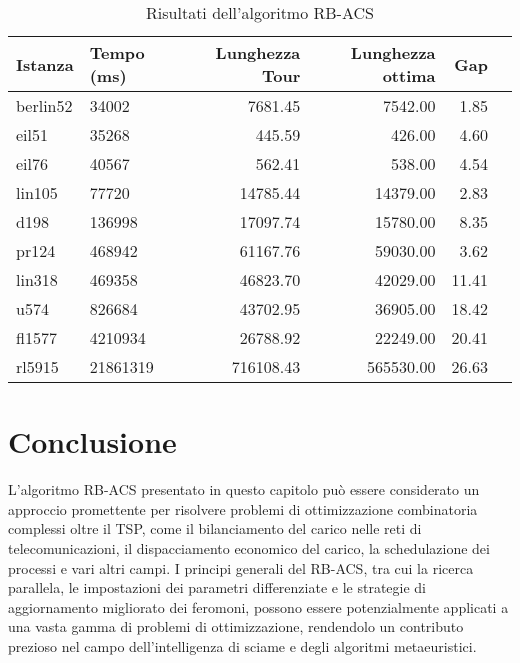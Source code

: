 \begin{table}
	\centering
	\caption{Risultati dell'algoritmo RB-ACS}
	\begin{tabular}{llrrrr}
		\toprule
		Istanza  & Tempo (ms) & Lunghezza Tour & Lunghezza ottima & Gap   \\
		\midrule
		berlin52 & 34002      & 7681.45        & 7542.00          & 1.85  \\
		eil51    & 35268      & 445.59         & 426.00           & 4.60  \\
		eil76    & 40567      & 562.41         & 538.00           & 4.54  \\
		lin105   & 77720      & 14785.44       & 14379.00         & 2.83  \\
		d198     & 136998     & 17097.74       & 15780.00         & 8.35  \\
		pr124    & 468942     & 61167.76       & 59030.00         & 3.62  \\
		lin318   & 469358     & 46823.70       & 42029.00         & 11.41 \\
		u574     & 826684     & 43702.95       & 36905.00         & 18.42 \\
		fl1577   & 4210934    & 26788.92       & 22249.00         & 20.41 \\
		rl5915   & 21861319   & 716108.43      & 565530.00        & 26.63 \\
		\bottomrule
	\end{tabular}
\end{table}

\section{Conclusione}

L'algoritmo \Gls{RB-ACS} presentato in questo capitolo può essere considerato un approccio promettente per risolvere problemi di ottimizzazione combinatoria
complessi oltre il  \Gls{TSP}, come il bilanciamento del carico nelle reti di telecomunicazioni,
il dispacciamento economico del carico, la schedulazione dei processi e vari altri campi. I principi generali del \Gls{RB-ACS}, tra cui la ricerca parallela, le impostazioni dei parametri differenziate e le strategie di aggiornamento migliorato dei feromoni, possono essere potenzialmente applicati a una vasta gamma di problemi di ottimizzazione, rendendolo un contributo prezioso nel campo dell'intelligenza di sciame e degli algoritmi metaeuristici.

